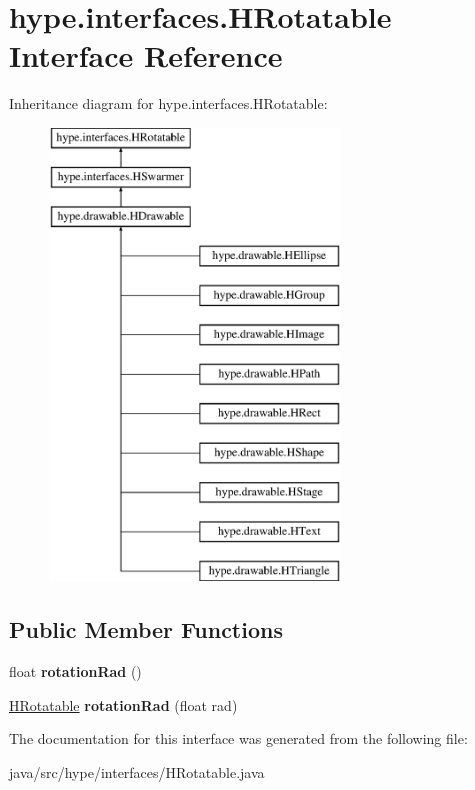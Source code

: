 \hypertarget{interfacehype_1_1interfaces_1_1_h_rotatable}{\section{hype.\-interfaces.\-H\-Rotatable Interface Reference}
\label{interfacehype_1_1interfaces_1_1_h_rotatable}
}
Inheritance diagram for hype.\-interfaces.\-H\-Rotatable\-:\begin{figure}[H]
\begin{center}
\leavevmode
\includegraphics[height=12.000000cm]{interfacehype_1_1interfaces_1_1_h_rotatable}
\end{center}
\end{figure}
\subsection*{Public Member Functions}
\begin{DoxyCompactItemize}
\item 
\hypertarget{interfacehype_1_1interfaces_1_1_h_rotatable_a58234d717326eed3afd60dc631aaaf31}{float {\bfseries rotation\-Rad} ()}\label{interfacehype_1_1interfaces_1_1_h_rotatable_a58234d717326eed3afd60dc631aaaf31}

\item 
\hypertarget{interfacehype_1_1interfaces_1_1_h_rotatable_a986752492a601933e80f1d96edb534f1}{\hyperlink{interfacehype_1_1interfaces_1_1_h_rotatable}{H\-Rotatable} {\bfseries rotation\-Rad} (float rad)}\label{interfacehype_1_1interfaces_1_1_h_rotatable_a986752492a601933e80f1d96edb534f1}

\end{DoxyCompactItemize}


The documentation for this interface was generated from the following file\-:\begin{DoxyCompactItemize}
\item 
java/src/hype/interfaces/H\-Rotatable.\-java\end{DoxyCompactItemize}
